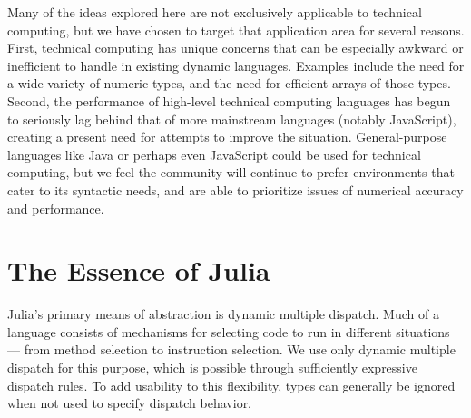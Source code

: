 \documentclass[11pt]{sigplanconf}
\begin{document}

Many of the ideas explored here are not exclusively applicable to technical
computing, but we have chosen to target that application area for several
reasons. First, technical computing has unique concerns that can be
especially awkward or inefficient to handle in existing dynamic languages.
Examples include the need for a wide variety of numeric types, and the need for
efficient arrays of those types. Second, the performance
of high-level technical computing languages has begun to seriously lag behind
that of more mainstream languages (notably JavaScript), creating a present
need for attempts to improve the situation.
General-purpose languages like Java or perhaps even JavaScript could
be used for technical computing, but we feel the community will continue to
prefer environments that cater to its syntactic needs, and are able to
prioritize issues of numerical accuracy and performance.


\section{The Essence of Julia}

Julia's primary means of abstraction is dynamic multiple dispatch.
Much of a language consists of mechanisms for selecting
code to run in different situations --- from method selection to
instruction selection. We use only dynamic multiple dispatch for this
purpose, which is possible through sufficiently expressive
dispatch rules. To add usability to this flexibility,
types can generally be ignored when not used to specify dispatch behavior.
\end{document}
